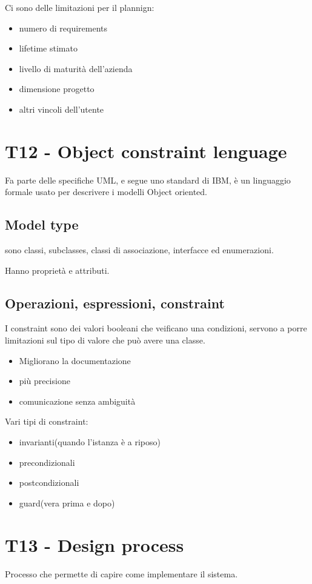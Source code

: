 \documentclass{article}
\begin{document}
Ci sono delle limitazioni per il plannign:
\begin{itemize}
    \item numero di requirements
    \item lifetime stimato
    \item livello di maturità dell'azienda
    \item dimensione progetto
    \item altri vincoli dell'utente
\end{itemize}

\section{T12 - Object constraint lenguage}
Fa parte delle specifiche UML, e segue uno standard di IBM, è un linguaggio 
formale usato per descrivere i modelli Object oriented.
\subsection{Model type}
sono classi, subclasses, classi di associazione, interfacce ed enumerazioni.

Hanno proprietà e attributi.
\subsection{Operazioni, espressioni, constraint}
I constraint sono dei valori booleani che veificano una condizioni, servono
a porre limitazioni sul tipo di valore che può avere una classe.

\begin{itemize}
    \item Migliorano la documentazione
    \item più precisione
    \item comunicazione senza ambiguità
\end{itemize}

Vari tipi di constraint:
\begin{itemize}
    \item invarianti(quando l'istanza è a riposo)
    \item precondizionali
    \item postcondizionali
    \item guard(vera prima e dopo)
\end{itemize}

\section{T13 - Design process}
Processo che permette di capire come implementare il sistema.
\end{document}
